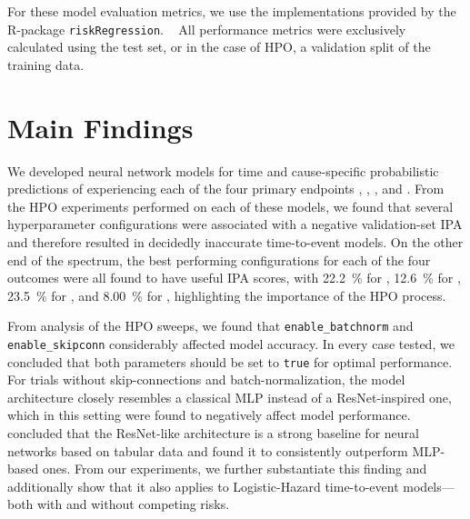 For these model evaluation metrics, 
we use the implementations provided by the R-package \texttt{riskRegression}.
~\autocite{gerdsMedical2021}
All performance metrics were exclusively calculated using 
the test set, or in the case of \ac{HPO}, a validation split of 
the training data.

\section{Main Findings}

We developed neural network models for
time and cause-specific probabilistic predictions of 
experiencing each of the four primary endpoints 
, , , and .
From the \ac{HPO} experiments performed on each of these models,
we found that several hyperparameter configurations were associated
with a negative validation-set \ac{IPA} and therefore resulted in 
decidedly inaccurate time-to-event models.
On the other end of the spectrum, 
the best performing configurations for each of the four outcomes
were all found to have useful \ac{IPA} scores,
with 
\qty{22.2}{\percent} for ,
\qty{12.6}{\percent} for ,
\qty{23.5}{\percent} for ,
and 
\qty{8.00}{\percent} for ,
highlighting the importance of the \ac{HPO} process.

From analysis of the \ac{HPO} sweeps,
we found that \verb|enable_batchnorm| and \verb|enable_skipconn| 
considerably affected model accuracy. 
In every case tested, 
we concluded that both parameters should be set to
\verb|true| for optimal performance. 
For trials without skip-connections and batch-normalization,
the model architecture closely resembles a classical \ac{MLP}
instead of a ResNet-inspired one, which in this setting 
were found to negatively affect model performance.
\textcite{gorishniyRevisiting2023} 
concluded that the ResNet-like architecture is a strong
baseline for neural networks based on tabular data
and found it to consistently outperform \ac{MLP}-based ones.
From our experiments, 
we further substantiate this finding and additionally show
that it also applies to Logistic-Hazard time-to-event models---%
both with and without competing risks.

